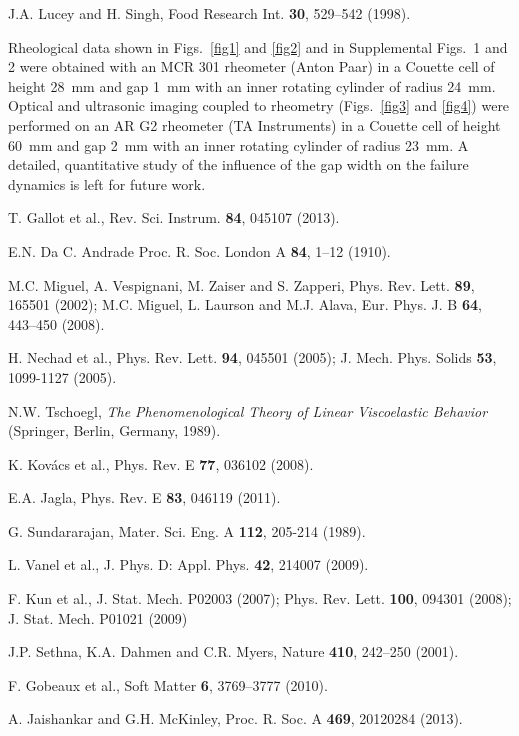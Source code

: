\documentclass[twocolumn,superscriptaddress,showpacs,preprintnumbers,amsmath,amssymb,prl]{revtex4}
\begin{document}
\begin{thebibliography}{}
 J.A. Lucey and H. Singh, Food Research Int. {\bf 30}, 529--542 (1998).

 Rheological data shown in Figs.~\ref{fig1} and \ref{fig2} and in Supplemental Figs.~1 and 2 were obtained with an MCR 301 rheometer (Anton Paar) in a Couette cell of height 28~mm and gap 1~mm with an inner rotating cylinder of radius 24~mm. Optical and ultrasonic imaging coupled to rheometry (Figs.~\ref{fig3} and \ref{fig4}) were performed on an AR G2 rheometer (TA Instruments) in a Couette cell of height 60~mm and gap 2~mm with an inner rotating cylinder of radius 23~mm. A detailed, quantitative study of the influence of the gap width on the failure dynamics is left for future work.

 T. Gallot et al., Rev. Sci. Instrum. {\bf 84}, 045107 (2013).

 E.N. Da C. Andrade Proc. R. Soc. London A {\bf 84}, 1--12 (1910).

 M.C. Miguel, A. Vespignani, M. Zaiser and S. Zapperi, Phys. Rev. Lett. {\bf 89}, 165501 (2002); M.C. Miguel, L. Laurson and M.J. Alava, Eur. Phys. J. B {\bf 64}, 443--450 (2008).

 H. Nechad et al., Phys. Rev. Lett. {\bf 94}, 045501 (2005); J. Mech. Phys. Solids {\bf 53}, 1099-1127 (2005).

  N.W. Tschoegl, {\it The Phenomenological Theory of Linear Viscoelastic Behavior} (Springer, Berlin, Germany, 1989).

 K. Kov\'acs et al., Phys. Rev. E \textbf{77}, 036102 (2008).

 E.A. Jagla, Phys. Rev. E {\bf 83}, 046119 (2011).

 G. Sundararajan, Mater. Sci. Eng. A {\bf 112}, 205-214 (1989).

 L. Vanel et al., J. Phys. D: Appl. Phys. {\bf 42}, 214007 (2009).

 F. Kun et al., J. Stat. Mech. P02003 (2007); Phys. Rev. Lett. {\bf 100}, 094301 (2008); J. Stat. Mech. P01021 (2009)

 J.P. Sethna, K.A. Dahmen and C.R. Myers, Nature {\bf 410}, 242--250 (2001).

 F. Gobeaux et al., Soft Matter {\bf 6}, 3769--3777 (2010).

 A. Jaishankar and G.H. McKinley, Proc. R. Soc. A {\bf 469}, 20120284 (2013).


\end{thebibliography}
\end{document}
